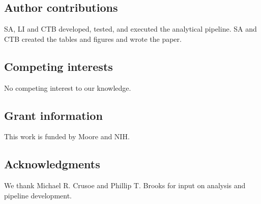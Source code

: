 \documentclass[11pt]{article}
\begin{document}
\subsection*{Author contributions}

SA, LI and CTB developed, tested, and executed the analytical pipeline.
SA and CTB created the tables and figures and wrote the paper.

\subsection*{Competing interests}
No competing interest to our knowledge.

\subsection*{Grant information}
This work is funded by Moore and NIH.

\subsection*{Acknowledgments}
We thank Michael R. Crusoe and Phillip T. Brooks for input on analysis
and pipeline development.

{\small }

\bigskip








\end{document}
